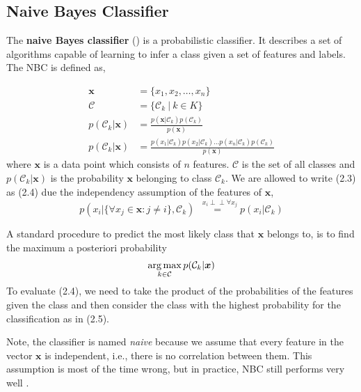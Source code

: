 \subsection{Naive Bayes Classifier}\label{section:nbc}
The \textbf{naive Bayes classifier} () is a probabilistic classifier. It describes a set of algorithms capable of learning to infer a class given a set of features and labels. The NBC is defined as,

\begin{align}
  \boldsymbol{x} &= \{x_1, x_2, \dots, x_n\} \\
  \mathcal{C} &= \{\mathcal{C}_k \: | \: k \in K \} \\
  p(\mathcal{C}_k|\boldsymbol{x}) &= \frac{p(\boldsymbol{x} |\mathcal{C}_k) p(\mathcal{C}_k)} {p(\boldsymbol{x})} \\
  p(\mathcal{C}_k|\boldsymbol{x}) &= \frac{p(x_1 |\mathcal{C}_k)
                                       p(x_2 |\mathcal{C}_k) \dots
                                       p(x_n |\mathcal{C}_k)
                                       p(\mathcal{C}_k)}{p(\boldsymbol{x})}
\end{align}
where $\boldsymbol{x}$ is a data point which consists of $n$ features. $\mathcal{C}$ is the set of all classes and $p(\mathcal{C}_k|\boldsymbol{x})$ is the probability $\boldsymbol{x}$ belonging to class $\mathcal{C}_k$. We are allowed to write (2.3) as (2.4) due the independency assumption of the features of $\boldsymbol{x}$,
 \[p(x_i| \{\forall x_j \in \boldsymbol{x} : j \neq i \}, \mathcal{C}_k) \overset{\, \,\,\,x_i\perp\!\!\!\perp \forall x_j}{=} p(x_i|\mathcal{C}_k)\]

A standard procedure to predict the most likely class that $\boldsymbol{x}$ belongs to, is to find the maximum a posteriori probability
\begin{gather}
  \operatorname*{arg\,max}_{k \in \mathcal{C}} p(\mathcal{C}_k|\boldsymbol{x})
\end{gather}
To evaluate (2.4), we need to take the product of the probabilities of the features given the class and then consider the class with the highest probability for the classification as in (2.5).

Note,  the classifier is named \textsl{naive} because we assume that every feature in the vector $\boldsymbol{x}$ is independent, i.e., there is no correlation between them. This assumption is most of the time wrong, but in practice, NBC still performs very well \citep{Rish2001}.


